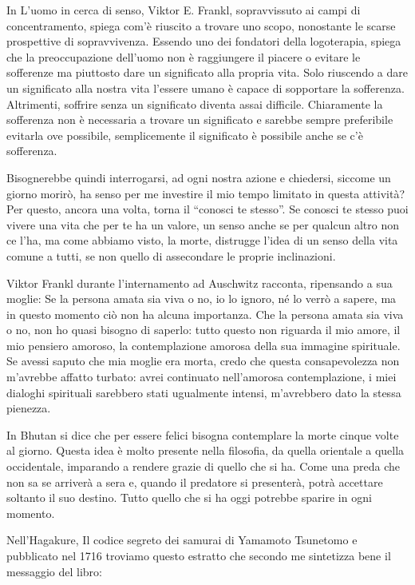 \documentclass[12pt]{book} %
\begin{document}
In L'uomo in cerca di senso, Viktor E. Frankl, sopravvissuto ai campi di
concentramento, spiega com'è riuscito a trovare uno scopo, nonostante le scarse prospettive di
sopravvivenza. Essendo uno dei fondatori della logoterapia, spiega che la preoccupazione dell'uomo non è raggiungere il
piacere o evitare le sofferenze ma piuttosto dare un significato alla propria vita. Solo riuscendo a dare un
significato alla nostra vita l'essere umano è capace di sopportare la sofferenza. Altrimenti,
soffrire senza un significato diventa assai difficile. Chiaramente la sofferenza non è necessaria a trovare un
significato e sarebbe sempre preferibile evitarla ove possibile, semplicemente il significato è possibile anche se c'è
sofferenza.

Bisognerebbe quindi interrogarsi, ad ogni nostra azione e chiedersi, siccome un giorno morirò, ha senso per me investire
il mio tempo limitato in questa attività? Per questo, ancora una volta, torna il “conosci te stesso”. Se conosci te
stesso puoi vivere una vita che per te ha un valore, un senso anche se per qualcun altro non ce
l'ha, ma come abbiamo visto, la morte, distrugge l'idea di un senso della
vita comune a tutti, se non quello di assecondare le proprie inclinazioni. 

Viktor Frankl durante l'internamento ad Auschwitz racconta, ripensando a sua moglie: Se la persona
amata sia viva o no, io lo ignoro, né lo verrò a sapere, ma in questo momento ciò non ha alcuna importanza. Che la
persona amata sia viva o no, non ho quasi bisogno di saperlo: tutto questo non riguarda il mio amore, il mio pensiero
amoroso, la contemplazione amorosa della sua immagine spirituale. Se avessi saputo che mia moglie era morta, credo che
questa consapevolezza non m'avrebbe affatto turbato: avrei continuato nell'amorosa contemplazione, i miei dialoghi
spirituali sarebbero stati ugualmente intensi, m'avrebbero dato la stessa pienezza. 

In Bhutan si dice che per essere felici bisogna contemplare la morte cinque volte al giorno. Questa idea è molto
presente nella filosofia, da quella orientale a quella occidentale, imparando a rendere grazie di quello che si ha.
Come una preda che non sa se arriverà a sera e, quando il predatore si presenterà, potrà accettare soltanto il suo
destino. Tutto quello che si ha oggi potrebbe sparire in ogni momento. 

Nell'Hagakure, Il codice segreto dei samurai di Yamamoto Tsunetomo e pubblicato nel
1716 troviamo questo
estratto che secondo me sintetizza bene il messaggio del libro:
\end{document}
